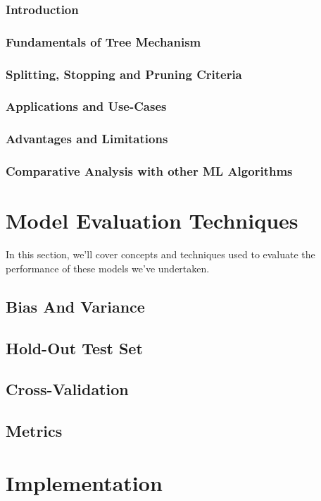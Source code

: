 \documentclass[letterpaper,10pt]{article}
\begin{document}
\subsubsection{Introduction}
\subsubsection{Fundamentals of Tree Mechanism}
\subsubsection{Splitting, Stopping and Pruning Criteria}
\subsubsection{Applications and Use-Cases}
\subsubsection{Advantages and Limitations}


\subsubsection{Comparative Analysis with other ML Algorithms}

\newpage
\section{Model Evaluation Techniques}
In this section, we'll cover concepts and techniques used to evaluate the performance of these models we've undertaken.
\subsection{Bias And Variance}
\subsection{Hold-Out Test Set}
\subsection{Cross-Validation}
\subsection{Metrics}

\newpage
\section{Implementation}
\end{document}

